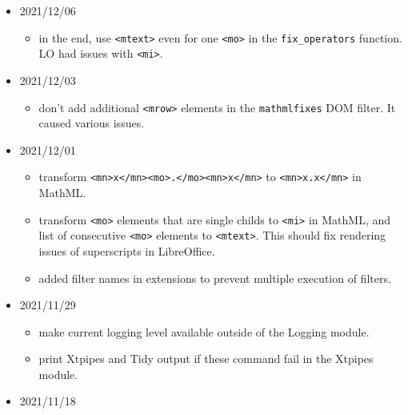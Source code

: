 \begin{itemize}
  \begin{itemize}
  \tightlist
  \item
    fixed setting of properties in the \texttt{staticsite} filter.
  \end{itemize}
\item
  2021/12/06

  \begin{itemize}
  \tightlist
  \item
    in the end, use \texttt{\textless{}mtext\textgreater{}} even for one
    \texttt{\textless{}mo\textgreater{}} in the \texttt{fix\_operators}
    function. LO had issues with \texttt{\textless{}mi\textgreater{}}.
  \end{itemize}
\item
  2021/12/03

  \begin{itemize}
  \tightlist
  \item
    don't add additional \texttt{\textless{}mrow\textgreater{}} elements
    in the \texttt{mathmlfixes} DOM filter. It caused various issues.
  \end{itemize}
\item
  2021/12/01

  \begin{itemize}
  \tightlist
  \item
    transform
    \texttt{\textless{}mn\textgreater{}x\textless{}/mn\textgreater{}\textless{}mo\textgreater{}.\textless{}/mo\textgreater{}\textless{}mn\textgreater{}x\textless{}/mn\textgreater{}}
    to
    \texttt{\textless{}mn\textgreater{}x.x\textless{}/mn\textgreater{}}
    in MathML.
  \item
    transform \texttt{\textless{}mo\textgreater{}} elements that are
    single childs to \texttt{\textless{}mi\textgreater{}} in MathML, and
    list of consecutive \texttt{\textless{}mo\textgreater{}} elements to
    \texttt{\textless{}mtext\textgreater{}}. This should fix rendering
    issues of superscripts in LibreOffice.
  \item
    added filter names in extensions to prevent multiple execution of
    filters.
  \end{itemize}
\item
  2021/11/29

  \begin{itemize}
  \tightlist
  \item
    make current logging level available outside of the Logging module.
  \item
    print Xtpipes and Tidy output if these command fail in the Xtpipes
    module.
  \end{itemize}
\item
  2021/11/18


\end{itemize}
